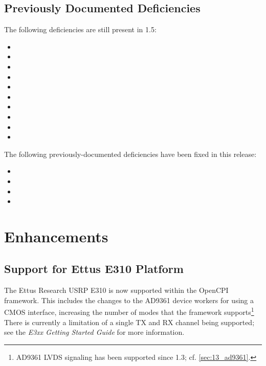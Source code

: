 \subsection{Previously Documented Deficiencies}
The following deficiencies are still present in 1.5:
\begin{itemize}
\setlength\itemsep{0em} %
\item {}
\item {}
\item {}
\item {}
\item {}
\item {}
\item {}
\item {}
\item {}
\item {}
\end{itemize}

The following previously-documented deficiencies have been fixed in this release:
\begin{itemize}
\setlength\itemsep{0em} %
\item {}
\item {}
\item {}
\item {}
\end{itemize}


\newpage
{}
\def\ocpiversion{v1.4.0}  %
\section{Enhancements}

\subsection{Support for Ettus E310 Platform} %
\label{sec:14_e310}
The Ettus Research USRP E310 is now supported within the OpenCPI framework. This includes the changes to the AD9361 device workers for using a CMOS interface, increasing the number of modes that the framework supports\footnote{AD9361 LVDS signaling has been supported since 1.3; cf. \ref{sec:13_ad9361}.} There is currently a limitation of a single TX and RX channel being supported; see the \textit{E3xx Getting Started Guide} for more information.

